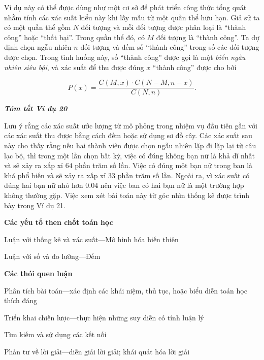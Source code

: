\documentclass[
  10pt,
  a4paper,
  landscape,
  twoside,
  openany
]{scrbook}
\begin{document}
{Ví dụ này có thể được dùng như một cơ sở để phát triển công thức tổng quát nhằm tính các xác suất kiểu này khi lấy mẫu từ một quần thể hữu hạn. Giả sử ta có một quần thể gồm $N$ đối tượng và mỗi đối tượng được phân loại là ``thành công'' hoặc ``thất bại''. Trong quần thể đó, có $M$ đối tượng là ``thành công''. Ta dự định chọn ngẫu nhiên $n$ đối tượng và đếm số ``thành công'' trong số các đối tượng được chọn. Trong tình huống này, số ``thành công'' được gọi là một \emph{biến ngẫu nhiên siêu bội}, và xác suất để thu được đúng $x$ ``thành công'' được cho bởi

$$
  P(x)=\frac{C(M,x)\cdot C(N-M,n-x)}{C(N,n)}.
$$

\noindent
\textbf{\emph{Tóm tắt Ví dụ 20}}

Lưu ý rằng các xác suất ước lượng từ mô phỏng trong nhiệm vụ đầu tiên gần với các xác suất thu được bằng cách đếm hoặc sử dụng sơ đồ cây. Các xác suất sau này cho thấy rằng nếu hai thành viên được chọn ngẫu nhiên lặp đi lặp lại từ câu lạc bộ, thì trong một lần chọn bất kỳ, việc có đúng không bạn nữ là khả dĩ nhất và sẽ xảy ra xấp xỉ $64$ phần trăm số lần. Việc có đúng một bạn nữ trong ban là khá phổ biến và sẽ xảy ra xấp xỉ $33$ phần trăm số lần. Ngoài ra, vì xác suất có đúng hai bạn nữ nhỏ hơn $0.04$ nên việc ban có hai bạn nữ là một trường hợp không thường gặp. Việc xem xét bài toán này từ góc nhìn thống kê được trình bày trong Ví dụ 21.

\noindent
\textbf{Các yếu tố then chốt toán học}

Luận với thống kê và xác suất---Mô hình hóa biến thiên  

Luận với số và đo lường---Đếm

\noindent
\textbf{Các thói quen luận}

Phân tích bài toán---xác định các khái niệm, thủ tục, hoặc biểu diễn toán học thích đáng  

Triển khai chiến lược---thực hiện những suy diễn có tính luận lý

Tìm kiếm và sử dụng các kết nối  

Phản tư về lời giải---diễn giải lời giải; khái quát hóa lời giải
}
\end{document}
